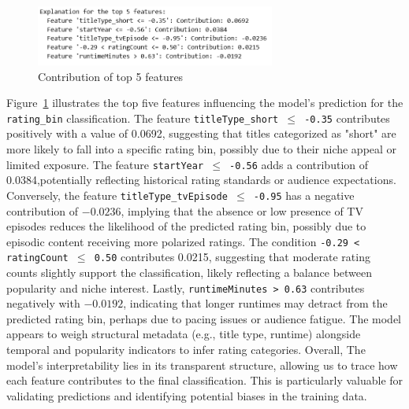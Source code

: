 \begin{figure}
    \centering
    \includegraphics[width=0.7\textwidth]{plotsss/rating_coeff.png}
    \caption{Contribution of top 5 features}
    \label{fig:rating_coeff}
\end{figure}


Figure~\ref{fig:rating_coeff} illustrates the top five features influencing the model's 
prediction for the \texttt{rating\_bin} classification. The feature \texttt{titleType\_short $\leq$ -0.35} 
contributes positively with a value of 0.0692, suggesting that titles categorized as "short" are more likely to fall into a 
specific rating bin, possibly due to their niche appeal or limited exposure. The feature \texttt{startYear $\leq$ -0.56} 
adds a contribution of 0.0384,potentially reflecting historical rating standards or audience expectations.
Conversely, the feature \texttt{titleType\_tvEpisode $\leq$ -0.95} has a negative contribution of $-0.0236$, implying that the 
absence or low presence of TV episodes reduces the likelihood of the predicted rating bin, possibly due to episodic 
content receiving more polarized ratings. The condition \texttt{-0.29 < ratingCount $\leq$ 0.50} contributes 0.0215, 
suggesting that moderate rating counts slightly support the classification, likely reflecting a balance between popularity 
and niche interest. Lastly, \texttt{runtimeMinutes > 0.63} contributes negatively with $-0.0192$, indicating that 
longer runtimes may detract from the predicted rating bin, perhaps due to pacing issues or audience fatigue.
The model appears to weigh structural metadata (e.g., title type, runtime) alongside temporal 
and popularity indicators to infer rating categories. Overall, The model's interpretability lies in its transparent structure, 
allowing us to trace how each feature contributes to the final classification. 
This is particularly valuable for validating predictions and identifying potential biases in the training data.